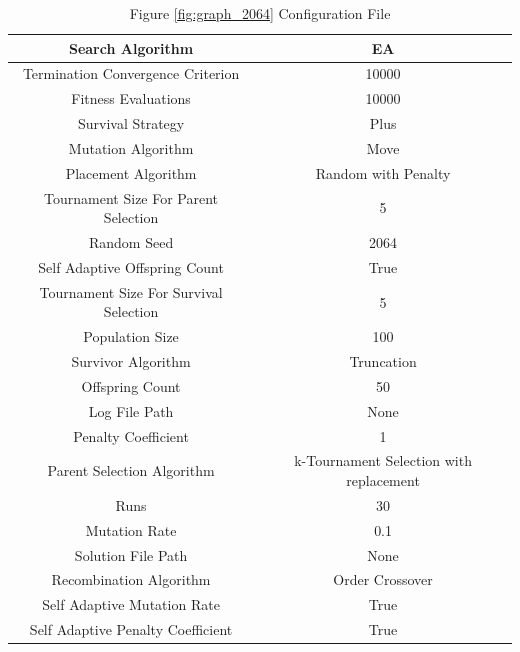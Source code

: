 \documentclass{standalone}
\begin{document}
\begin{table}[!htb]
	\centering
	\caption{Figure \ref{fig:graph_2064} Configuration File}
	\label{tab:graph_2064}
	\begin{tabular}{| c | c |}
		\hline
		Search Algorithm		& EA		 \\
		\hline
		Termination Convergence Criterion		& 10000		 \\
		\hline
		Fitness Evaluations		& 10000		 \\
		\hline
		Survival Strategy		& Plus		 \\
		\hline
		Mutation Algorithm		& Move		 \\
		\hline
		Placement Algorithm		& Random with Penalty		 \\
		\hline
		Tournament Size For Parent Selection		& 5		 \\
		\hline
		Random Seed		& 2064		 \\
		\hline
		Self Adaptive Offspring Count		& True		 \\
		\hline
		Tournament Size For Survival Selection		& 5		 \\
		\hline
		Population Size		& 100		 \\
		\hline
		Survivor Algorithm		& Truncation		 \\
		\hline
		Offspring Count		& 50		 \\
		\hline
		Log File Path		& None		 \\
		\hline
		Penalty Coefficient		& 1		 \\
		\hline
		Parent Selection Algorithm		& k-Tournament Selection with replacement		 \\
		\hline
		Runs		& 30		 \\
		\hline
		Mutation Rate		& 0.1		 \\
		\hline
		Solution File Path		& None		 \\
		\hline
		Recombination Algorithm		& Order Crossover		 \\
		\hline
		Self Adaptive Mutation Rate		& True		 \\
		\hline
		Self Adaptive Penalty Coefficient		& True		 \\
		\hline
	\end{tabular}
\end{table}
\end{document}
